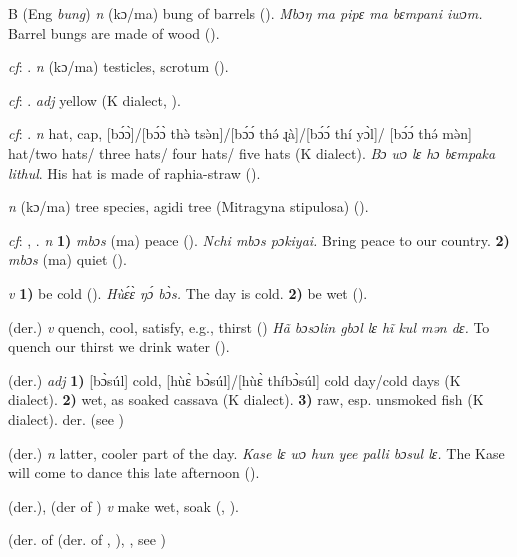 \begin{letter}{B}
 (Eng \textit{bung}) \textit{n} (kɔ/ma) bung of barrels (\citealt{Pichl1967}). \textit{Mbɔŋ ma pipɛ ma bɛmpani iwɔm.} Barrel bungs are made of wood (\citealt{Pichl1967}).

 \textit{cf}: . \textit{n} (kɔ/ma) testicles, scrotum (\citealt{Pichl1967}).

 \textit{cf}: . \textit{adj} yellow (K dialect, \citealt{Pichl1967}).

 \textit{cf}: . \textit{n} hat, cap, [bɔ́ɔ̀]/[bɔ́ɔ̀ thə̀ tsə̀n]/[bɔ́ɔ́ thə́ ɻà]/[bɔ́ɔ́ thí yɔ̀l]/ [bɔ́ɔ́ thə́ mə̀n] hat/two hats/ three hats/ four hats/ five hats (K dialect). \textit{Bɔ wɔ lɛ hɔ bɛmpaka lithul}. His hat is made of raphia-straw (\citealt{Pichl1967}). 

 \textit{n} (kɔ/ma) tree species, agidi tree (Mitragyna stipulosa) (\citealt{Pichl1967}).

 \textit{cf}: , . \textit{n} \textbf{1)} \textit{mbɔs} (ma) peace (\citealt{Pichl1967}). \textit{Nchi mbɔs pɔkiyai.} Bring peace to our country. \textbf{2)} \textit{mbɔs} (ma) quiet (\citealt{Pichl1967}).

 \textit{v} \textbf{1)} be cold (\citealt{Pichl1967}). \textit{Hùɛ́ɛ̀ ŋɔ́ bɔ̀s.} The day is cold. \textbf{2)} be wet (\citealt{Pichl1967}).

 (der.) \textit{v} quench, cool, satisfy, e.g., thirst (\citealt{Pichl1967}) \textit{Hã bɔsɔlin gbɔl lɛ hĩ kul mən dɛ.} To quench our thirst we drink water (\citealt{Pichl1967}).

 (der.) \textit{adj} \textbf{1)} [bɔ̀súl] cold, [hùɛ̀ bɔ̀súl]/[hùɛ̀ thíbɔ̀súl] cold day/cold days (K dialect). \textbf{2)} wet, as soaked cassava (K dialect). \textbf{3)} raw, esp. unsmoked fish (K dialect). der.  (see )

 (der.) \textit{n} latter, cooler part of the day. \textit{Kase lɛ wɔ hun yee palli bɔsul lɛ.} The Kase will come to dance this late afternoon (\citealt{Pichl1967}). 

 (der.), (der of ) \textit{v} make wet, soak (\citealt{Pichl1967}, \citealt{Sumner1921}). 

 (der. of  (der. of , ), , see ) 


\end{letter}
